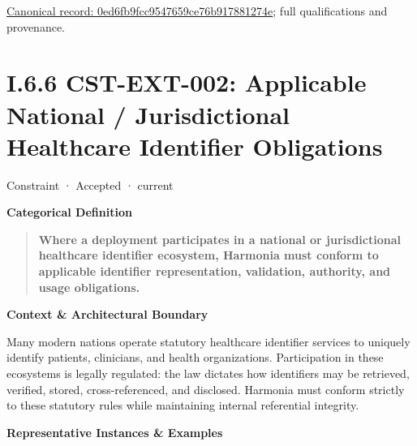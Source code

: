 {\footnotesize \href{../../../../continuum/motivation/constraint/0ed6fb9fcc9547659ce76b917881274e.md}{Canonical record: 0ed6fb9fcc9547659ce76b917881274e}; full qualifications and provenance.}\par
\section*{I.6.6 CST-EXT-002: Applicable National / Jurisdictional Healthcare Identifier Obligations}
\label{navigation:I.6.6}

\label{element:edb1db6b18d84487ab48b9416f26e980}
{\small Constraint · Accepted · current}\par

\par\medskip\textbf{Categorical Definition}\par


\begin{quote}


\textbf{Where a deployment participates in a national or jurisdictional healthcare identifier ecosystem, Harmonia must conform to applicable identifier representation, validation, authority, and usage obligations.}



\end{quote}


\par\medskip\textbf{Context \& Architectural Boundary}\par


Many modern nations operate statutory healthcare identifier services to uniquely identify patients, clinicians, and health organizations. Participation in these ecosystems is legally regulated: the law dictates how identifiers may be retrieved, verified, stored, cross-referenced, and disclosed. Harmonia must conform strictly to these statutory rules while maintaining internal referential integrity.



\par\medskip\textbf{Representative Instances \& Examples}\par


